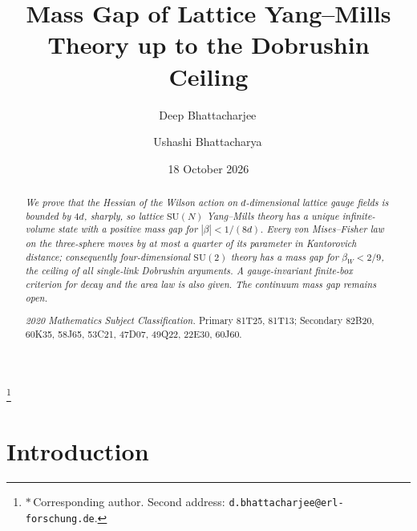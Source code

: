 \documentclass[aps,prd,twocolumn,superscriptaddress,nofootinbib,longbibliography,floatfix,amsmath,amssymb,10pt]{revtex4-2}
\theoremstyle{definition}
\theoremstyle{remark}
\newcommand{\SU}{\mathrm{SU}}
\begin{document}
\title{Mass Gap of Lattice Yang--Mills Theory up to the Dobrushin Ceiling}

\author{Deep Bhattacharjee\,}
\thanks{$*$\,Corresponding author. Second address:
\nolinkurl{d.bhattacharjee@erl-forschung.de}.}

\author{Ushashi Bhattacharya\,}

\date{18 October 2026}

\begin{abstract}
\itshape
We prove that the Hessian of the Wilson action on $d$-dimensional lattice
gauge fields is bounded by $4d$, sharply, so lattice $\SU(N)$ Yang--Mills
theory has a unique infinite-volume state with a positive mass gap for
$|\beta|<1/(8d)$. Every von Mises--Fisher law on the three-sphere moves by at
most a quarter of its parameter in Kantorovich distance; consequently
four-dimensional $\SU(2)$ theory has a mass gap for $\beta_W<2/9$, the
ceiling of all single-link Dobrushin arguments. A gauge-invariant finite-box criterion
for decay and the area law is also given. The continuum mass gap remains
open.
\par\medskip\upshape\noindent
\textit{2020 Mathematics Subject Classification.} Primary 81T25, 81T13;
Secondary 82B20, 60K35, 58J65, 53C21, 47D07, 49Q22, 22E30, 60J60.
\end{abstract}


\maketitle

\makeatletter
\renewcommand\l@subsection[2]{}
\renewcommand\l@subsubsection[2]{}
\makeatother
\tableofcontents

\section{Introduction}\label{sec:intro}
\end{document}
